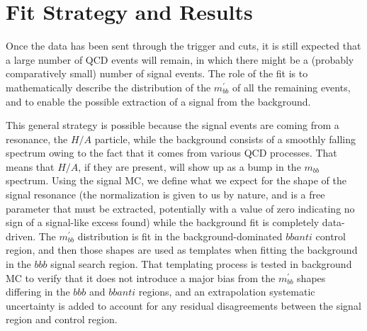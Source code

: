  

\chapter[Fit Strategy and Results]{Fit Strategy and Results}


Once the data has been sent through the trigger and cuts, it is still expected
that a large number of QCD events will remain, in which there might be a (probably comparatively small)
number of signal events.  The role of the fit is to mathematically describe
the distribution of the $m_{bb}^{'}$ of all the remaining events, and to enable the
possible extraction of a signal from the background.  

This general strategy is possible because the signal events are coming from a 
resonance, the $H/A$ particle, while the background consists of a smoothly 
falling spectrum owing to the fact that it comes from various QCD processes.
That means that $H/A$, if they are present, will show up as a bump in the $m_{bb}$
spectrum.  Using the signal MC, we define what we expect for the shape of
the signal resonance (the normalization is given to us by nature, and 
is a free parameter that must be extracted, potentially with a value of zero
indicating no sign of a signal-like excess found) 
while the background fit is completely data-driven. The $m_{bb}^{'}$ distribution 
is fit in the background-dominated $bbanti$ control region, and then those shapes 
are used as templates when fitting the background in the $bbb$ signal 
search region.  That templating process is tested in background MC to verify
that it does not introduce a major bias from the $m_{bb}^{'}$ shapes differing
in the $bbb$ and $bbanti$ regions, and an extrapolation systematic uncertainty
is added to account for any residual disagreements between the signal region
and control region.
    
    

